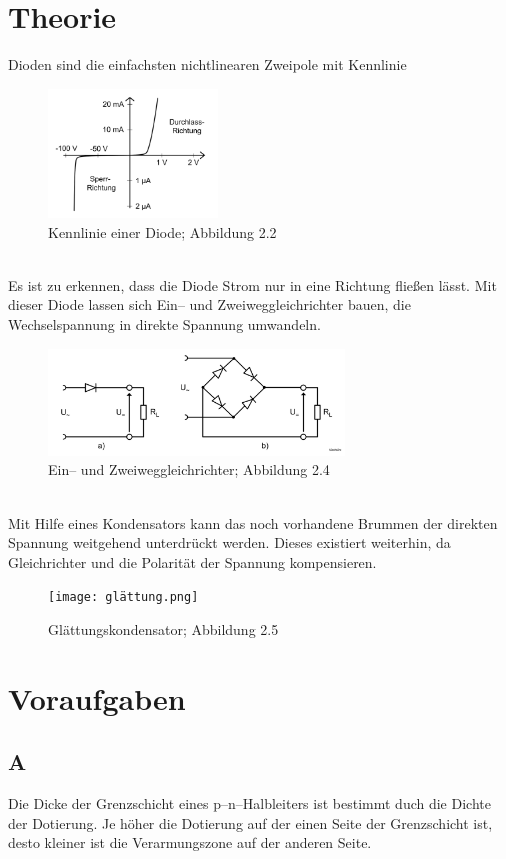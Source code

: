 \documentclass[a4paper,10pt]{article}
\numberwithin{equation}{section}
\begin{document}
\section{Theorie}
Dioden sind die einfachsten nichtlinearen Zweipole mit Kennlinie
\begin{figure}[h]
        \centering
        \includegraphics[width=0.4\textwidth]{diode_kennlinie.png}
        \caption{Kennlinie einer Diode; Abbildung 2.2 \cite{Praktikumsanleitung}}
\end{figure}\\
Es ist zu erkennen, dass die Diode Strom nur in eine Richtung fließen lässt.
Mit dieser Diode lassen sich Ein-- und Zweiweggleichrichter bauen, die Wechselspannung in direkte Spannung umwandeln.
\begin{figure}[h]
        \centering
        \includegraphics[width=0.7\textwidth]{ein_zweiweggleichrichter.png}
        \caption{Ein-- und Zweiweggleichrichter; Abbildung 2.4 \cite{Praktikumsanleitung}}
\end{figure}\\
Mit Hilfe eines Kondensators kann das noch vorhandene Brummen der direkten Spannung weitgehend unterdrückt werden.
Dieses existiert weiterhin, da Gleichrichter und die Polarität der Spannung kompensieren.
\begin{figure}[h]
        \centering
        \texttt{[image: glättung.png]}
        \caption{Glättungskondensator; Abbildung 2.5 \cite{Praktikumsanleitung}}
\end{figure}

\clearpage
\section{Voraufgaben}
\subsection{A}
Die Dicke der Grenzschicht eines p--n--Halbleiters ist bestimmt duch die Dichte der Dotierung.
Je höher die Dotierung auf der einen Seite der Grenzschicht ist, desto kleiner ist die Verarmungszone auf der anderen Seite.
\end{document}
